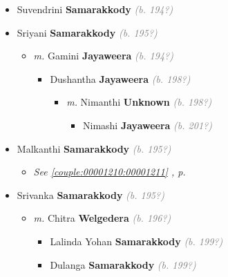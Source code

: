 \documentclass[10pt, openany]{book}
\begin{document}
\begin{itemize}
{\begin{itemize}
{\begin{itemize}
{\begin{itemize}
\item{Suvendrini \textbf{Samarakkody} \textcolor{gray}{\textit{(b. 194?)}}
 }
\item{Sriyani \textbf{Samarakkody} \textcolor{gray}{\textit{(b. 195?)}}
\begin{itemize}
\item{\textit{m.} Gamini \textbf{Jayaweera} \textcolor{gray}{\textit{(b. 194?)}}   \label{couple:00001249:00001250} \begin{itemize}
\item{Dushantha \textbf{Jayaweera} \textcolor{gray}{\textit{(b. 198?)}}
\begin{itemize}
\item{\textit{m.} Nimanthi \textbf{Unknown} \textcolor{gray}{\textit{(b. 198?)}}   \label{couple:00001251:00002409} \begin{itemize}
\item{Nimashi \textbf{Jayaweera} \textcolor{gray}{\textit{(b. 201?)}}
 }
\end{itemize}}
\end{itemize}
 }
\end{itemize}}
\end{itemize}
 }
\item{Malkanthi \textbf{Samarakkody} \textcolor{gray}{\textit{(b. 195?)}}
\begin{itemize}
\item{\textcolor{slteal}{\textit{See  \autoref{couple:00001210:00001211} \textit{, p. \pageref{couple:00001210:00001211} }}}}
\end{itemize}
 }
\item{Srivanka \textbf{Samarakkody} \textcolor{gray}{\textit{(b. 195?)}}
\begin{itemize}
\item{\textit{m.} Chitra \textbf{Welgedera} \textcolor{gray}{\textit{(b. 196?)}}   \label{couple:00001239:00001240} \begin{itemize}
\item{Lalinda Yohan \textbf{Samarakkody} \textcolor{gray}{\textit{(b. 199?)}}
  }
\item{Dulanga \textbf{Samarakkody} \textcolor{gray}{\textit{(b. 199?)}}
 }
\end{itemize}}
\end{itemize}
 }

\end{itemize}}
\end{itemize}}
\end{itemize}}
\end{itemize}
\end{document}
